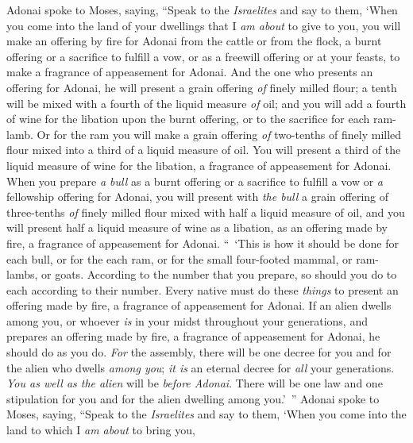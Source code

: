 \begin{biblechapter} %
 Adonai spoke to Moses, saying,
\verse “Speak to the \textit{Israelites} and say to them, ‘When you come into the land of your dwellings that I \textit{am about} to give to you,
\verse you will make an offering by fire for Adonai from the cattle or from the flock, a burnt offering or a sacrifice to fulfill a vow, or as a freewill offering or at your feasts, to make a fragrance of appeasement for Adonai.
\verse And the one who presents an offering for Adonai, he will present a grain offering \textit{of} finely milled flour; a tenth will be mixed with a fourth of the liquid measure \textit{of} oil;
\verse and you will add a fourth of wine for the libation upon the burnt offering, or to the sacrifice for each ram-lamb.
\verse Or for the ram you will make a grain offering \textit{of} two-tenths of finely milled flour mixed into a third of a liquid measure of oil.
\verse You will present a third of the liquid measure of wine for the libation, a fragrance of appeasement for Adonai.
\verse When you prepare \textit{a bull} as a burnt offering or a sacrifice to fulfill a vow or \textit{a} fellowship offering for Adonai,
\verse you will present with \textit{the bull} a grain offering of three-tenths \textit{of} finely milled flour mixed with half a liquid measure of oil,
\verse and you will present half a liquid measure of wine as a libation, as an offering made by fire, a fragrance of appeasement for Adonai.
\verse “ ‘This is how it should be done for each bull, or for the each ram, or for the small four-footed mammal, or ram-lambs, or goats.
\verse According to the number that you prepare, so should you do to each according to their number.
\verse Every native must do these \textit{things} to present an offering made by fire, a fragrance of appeasement for Adonai.
\verse If an alien dwells among you, or whoever \textit{is} in your midst throughout your generations, and prepares an offering made by fire, a fragrance of appeasement for Adonai, he should do as you do.
\verse \textit{For} the assembly, there will be one decree for you and for the alien who dwells \textit{among you}; \textit{it is} an eternal decree for \textit{all} your generations. \textit{You as well as the alien} will be \textit{before Adonai}.
\verse There will be one law and one stipulation for you and for the alien dwelling among you.’ ”
\verse Adonai spoke to Moses, saying,
\verse “Speak to the \textit{Israelites} and say to them, ‘When you come into the land to which I \textit{am about} to bring you,

\end{biblechapter}
